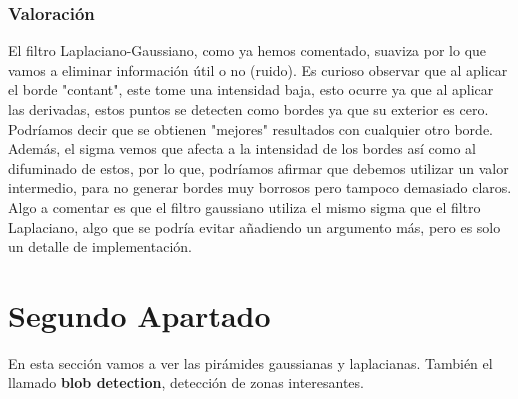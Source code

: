 \documentclass{article}
\begin{document}
\newpage

\subsubsection{Valoración}
El filtro Laplaciano-Gaussiano, como ya hemos comentado, suaviza por lo que vamos a eliminar información útil o no (ruido).
\newline
\newline
Es curioso observar que al aplicar el borde "contant", este tome una intensidad baja, esto ocurre ya que al aplicar las derivadas, estos puntos se detecten como bordes ya que su exterior es cero. Podríamos decir que se obtienen "mejores" resultados con cualquier otro borde.
\newline
\newline
Además, el sigma vemos que afecta a la intensidad de los bordes así como al difuminado de estos, por lo que, podríamos afirmar que debemos utilizar un valor intermedio, para no generar bordes muy borrosos pero tampoco demasiado claros.
\newline
\newline
Algo a comentar es que el filtro gaussiano utiliza el mismo sigma que el filtro Laplaciano, algo que se podría evitar añadiendo un argumento más, pero es solo un detalle de implementación.

\newpage

\section{Segundo Apartado}
En esta sección vamos a ver las pirámides gaussianas y laplacianas. También el llamado \textbf{blob detection}, detección de zonas interesantes.
\end{document}
